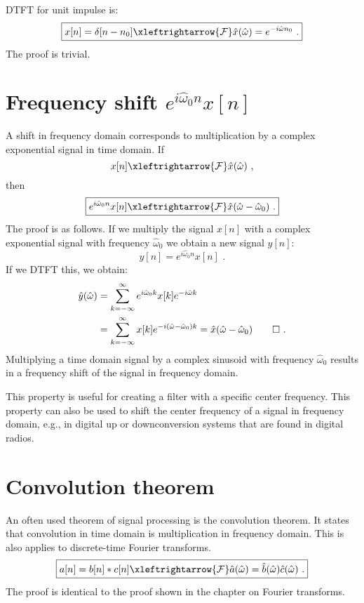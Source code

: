 DTFT for unit impulse is:
\begin{equation}
\boxed{
x[n] = \delta[n-n_0] \xleftrightarrow{\mathcal{F}} \hat{x}(\hat{\omega}) = e^{-i\hat{\omega}n_0}\,\,.
}
\end{equation}
The proof is trivial. 

\section{Frequency shift $e^{i\hat{\omega}_0n}x[n]$}

A shift in frequency domain corresponds to multiplication
by a complex exponential signal in time domain.  If
\begin{equation}
x[n] \xleftrightarrow{\mathcal{F}} \hat{x}(\hat{\omega})\,\,,
\end{equation}
then
\begin{equation}
\boxed{
e^{i\hat{\omega}_0 n}x[n] \xleftrightarrow{\mathcal{F}} \hat{x}(\hat{\omega}-\hat{\omega}_0)\,\,.
}
\end{equation}
The proof is as follows. If we multiply the signal $x[n]$ with a
complex exponential signal with frequency $\hat{\omega}_0$ we obtain a
new signal $y[n]$:
\begin{equation}
y[n] = e^{i\hat{\omega}_0 n}x[n]\,\,. 
\end{equation}
If we DTFT this, we obtain:
\begin{align}
\hat{y}(\hat{\omega})&=\sum_{k=-\infty}^{\infty} e^{i\hat{\omega}_0 k}x[k]e^{-i\hat{\omega}k} \\
&=\sum_{k=-\infty}^{\infty} x[k] e^{-i(\hat{\omega}-\hat{\omega}_0)k} = \hat{x}(\hat{\omega}-\hat{\omega}_0)\qed\,\,.
\end{align}
Multiplying a time domain signal by a complex sinusoid with frequency
$\hat{\omega}_0$ results in a frequency shift of the signal in
frequency domain.

This property is useful for creating a filter with a specific center
frequency. This property can also be used to shift the center
frequency of a signal in frequency domain, e.g., in digital up or
downconversion systems that are found in digital radios.

\section{Convolution theorem}
An often used theorem of signal processing is the convolution theorem. It
states that convolution in time domain is multiplication in frequency
domain. This is also applies to discrete-time Fourier transforms.
\begin{equation}
\boxed{
a[n] = b[n]*c[n] \xleftrightarrow{\mathcal{F}} \hat{a}(\hat{\omega}) = \hat{b}(\hat{\omega})\hat{c}(\hat{\omega})\,\,.
}
\end{equation}
The proof is identical to the proof shown in the chapter on Fourier transforms.

